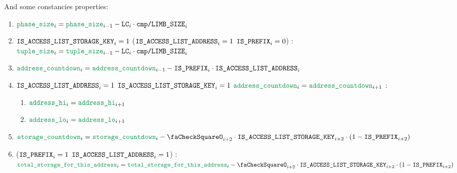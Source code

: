 \begin{enumerate}[resume]
		And some constancies properties:
		\begin{enumerate}
			\item $\locPhaseSize _{i} = \locPhaseSize _{i - 1} - \lc _{i} \cdot \rlpTxnComputationColumnLimbSize _{i}$
			\item \If $\texttt{IS\_ACCESS\_LIST\_STORAGE\_KEY} _{i} =1$ \Or ($\texttt{IS\_ACCESS\_LIST\_ADDRESS} _{i} =1$ \et $\texttt{\texttt{IS\_PREFIX}} _{i} =0$) \Then: $\locAccessListTupleSize _{i} = \locAccessListTupleSize _{i - 1} - \lc _{i} \cdot \rlpTxnComputationColumnLimbSize _{i}$
			\item $\locAddressPrewarmingCountdown _{i} = \locAddressPrewarmingCountdown _{i - 1} - \rlpTxnSharedColumnIsPrefix _{i} \cdot \rlpTxnSharedColumnIsAccessListAddress _{i}$
			\item \If $\texttt{IS\_ACCESS\_LIST\_ADDRESS} _{i} =1$ \et $\texttt{IS\_ACCESS\_LIST\_STORAGE\_KEY} _{i}=1$ \et $\locAddressPrewarmingCountdown _{i} = \locAddressPrewarmingCountdown _{i + 1}$ \Then:
				\begin{enumerate}
					\item $\locAddressHi _{i} = \locAddressHi _{i + 1}$
					\item $\locAddressLo _{i} = \locAddressLo _{i + 1}$
				\end{enumerate}
			\item $\locStoragePrewarmingCountdown _{i} = \locStoragePrewarmingCountdown _{i} - \done _{i + 2} \cdot \rlpTxnSharedColumnIsAccessListStorageKey _{i + 2} \cdot (1 - \rlpTxnSharedColumnIsPrefix _{i + 2})$
			\item \If ($\texttt{\texttt{IS\_PREFIX}} _{i} =1$ \et $\texttt{IS\_ACCESS\_LIST\_ADDRESS} _{i} =1$) \Then: $\locTotStorageForThisAddress _{i} = \locTotStorageForThisAddress _{i} - \done _{i + 2} \cdot \rlpTxnSharedColumnIsAccessListStorageKey _{i + 2} \cdot (1 - \rlpTxnSharedColumnIsPrefix _{i + 2})$
		\end{enumerate}
	\end{enumerate}
